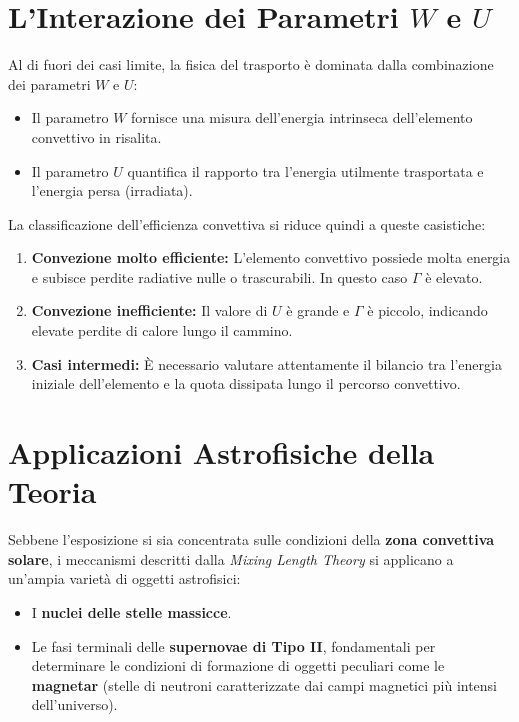 \section{L'Interazione dei Parametri $W$ e $U$}

Al di fuori dei casi limite, la fisica del trasporto è dominata dalla combinazione dei parametri $W$ e $U$:
\begin{itemize}
\item Il parametro \textbf{$W$} fornisce una misura dell'energia intrinseca dell'elemento convettivo in risalita.
\item Il parametro \textbf{$U$} quantifica il rapporto tra l'energia utilmente trasportata e l'energia persa (irradiata).
\end{itemize}

La classificazione dell'efficienza convettiva si riduce quindi a queste casistiche:
\begin{enumerate}
\item \textbf{Convezione molto efficiente:} L'elemento convettivo possiede molta energia e subisce perdite radiative nulle o trascurabili. In questo caso $\Gamma$ è elevato.
\item \textbf{Convezione inefficiente:} Il valore di $U$ è grande e $\Gamma$ è piccolo, indicando elevate perdite di calore lungo il cammino.
\item \textbf{Casi intermedi:} È necessario valutare attentamente il bilancio tra l'energia iniziale dell'elemento e la quota dissipata lungo il percorso convettivo.
\end{enumerate}

\section{Applicazioni Astrofisiche della Teoria}

Sebbene l'esposizione si sia concentrata sulle condizioni della \textbf{zona convettiva solare}, i meccanismi descritti dalla \textit{Mixing Length Theory} si applicano a un'ampia varietà di oggetti astrofisici:
\begin{itemize}
\item I \textbf{nuclei delle stelle massicce}.
\item Le fasi terminali delle \textbf{supernovae di Tipo II}, fondamentali per determinare le condizioni di formazione di oggetti peculiari come le \textbf{magnetar} (stelle di neutroni caratterizzate dai campi magnetici più intensi dell'universo).
\end{itemize}

